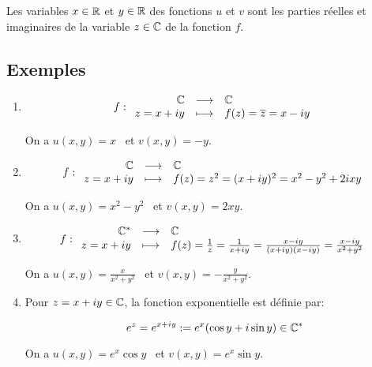 \begin{remark}
    Les variables $x \in \mathbb{R}$ et $y \in \mathbb{R}$ des fonctions $u$ et $v$ sont les parties réelles et imaginaires de la variable $z \in \mathbb{C}$ de la fonction $f$.
\end{remark}

\subsection{Exemples}

\begin{example}\hfill
\begin{enumerate}[label=\arabic{enumi})]
    \item 
    \[
    f: \begin{array}{{rcl}}
    \Cx & \longrightarrow & \Cx \\
    z = x+iy & \longmapsto & f(z) = \conj{z} = x - iy \\
    \end{array}
    \]
    
    On a $u(x,y) = x \enspace$ et $v(x,y)=-y$.
    
    \item 
    \[
    f: \begin{array}{{rcl}}
    \Cx & \longrightarrow & \Cx \\
    z = x+iy & \longmapsto & f(z) = z^2 = (x + iy)^2 = x^2 - y^2 + 2ixy \\
    \end{array}
    \]
    
    On a $u(x,y) = x^2 - y^2 \enspace$ et $v(x,y)= 2xy$.
    
    \item 
    \[
    f: \begin{array}{{rcl}}
    \Cx^* & \longrightarrow & \Cx \\
    z = x+iy & \longmapsto & f(z) = \frac{1}{z}
    = \frac{1}{x + iy}
    = \frac{x - iy}{(x + iy)(x - iy)}
    = \frac{x - iy}{x^2 + y^2} \\
    \end{array}
    \]
    
    On a $u(x,y) = \frac{x}{x^2 + y^2} \enspace$ et $v(x,y)= -\frac{y}{x^2 + y^2}$.
    
    \item 
    Pour $z = x + iy \in \mathbb{C}$, la fonction exponentielle est définie par:
    
    \[e^z = e^{x + iy} := e^x(\cos y + i \sin y) \in \mathbb{C}^*\]
    
    On a $u(x,y) = e^x \cos y \enspace$ et $v(x,y)= e^x \sin y$.
    

\end{enumerate}
\end{example}
